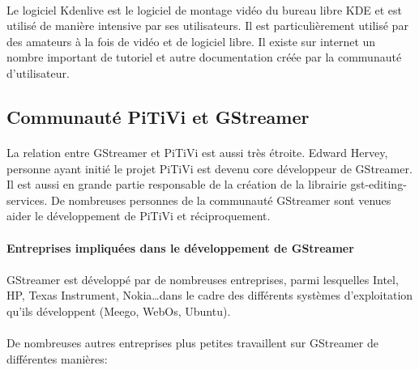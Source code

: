 \paragraph{}

Le logiciel Kdenlive est le logiciel de montage vidéo du bureau libre
KDE et est utilisé de manière intensive par ses utilisateurs. Il est
particulièrement utilisé par des amateurs à la fois de vidéo et de
logiciel libre. Il existe sur internet un nombre important de tutoriel
et autre documentation créée par la communauté d'utilisateur.

\subsection {Communauté PiTiVi et GStreamer}

\paragraph {}

La relation entre GStreamer et PiTiVi est aussi très étroite. Edward
Hervey, personne ayant initié le projet PiTiVi est devenu core
développeur de GStreamer. Il est aussi en grande partie responsable de
la création de la librairie gst-editing-services. De nombreuses personnes
de la communauté GStreamer sont venues aider le développement de PiTiVi
et réciproquement.

\paragraph {Entreprises impliquées dans le développement de GStreamer}

\paragraph{}

GStreamer est développé par de nombreuses entreprises, parmi lesquelles
Intel, HP, Texas Instrument, Nokia\ldots dans le cadre des différents
systèmes d'exploitation qu'ils développent (Meego, WebOs, Ubuntu).

\paragraph{}

De nombreuses autres entreprises plus petites travaillent sur GStreamer
de différentes manières:

